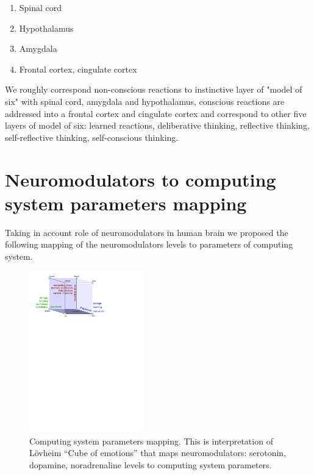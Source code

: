 \begin{enumerate}
 \item  Spinal cord
 \item  Hypothalamus
 \item  Amygdala
 \item  Frontal cortex, cingulate cortex
\end{enumerate}

We roughly correspond non-conscious reactions to instinctive layer of "model of six" \cite{emotionmachine} with spinal cord, amygdala and hypothalamus, conscious reactions are addressed into a frontal cortex and cingulate cortex and correspond to other five layers of model of six: learned reactions, deliberative thinking, reflective thinking, self-reflective thinking, self-conscious thinking.

\section{Neuromodulators to computing system parameters mapping}

Taking in account role of neuromodulators in human brain \cite{cubeofemotions, emotionsbraintorobot, neuromodulatory} we proposed the following mapping of the neuromodulators levels to parameters of computing system.

\begin{figure}
\begin{center}
 \includegraphics[height=7cm]{figure3_cube_of_parameters}
\end{center}
\caption{Computing system parameters mapping. This is interpretation of  L\"{o}vheim ``Cube of emotions'' \cite{cubeofemotions} that maps neuromodulators: serotonin, dopamine, noradrenaline levels to computing system parameters.}
\label{figure3_cube_of_parameters}
\end{figure}

